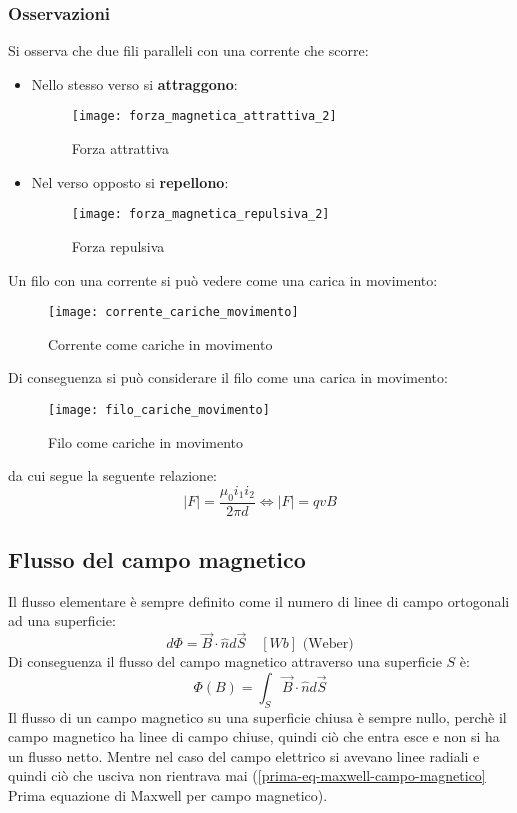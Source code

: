 \documentclass[a4paper]{article}
\begin{document}
\subsubsection{Osservazioni}
Si osserva che due fili paralleli con una corrente che scorre:
\begin{itemize}
  \item Nello stesso verso si \textbf{attraggono}:
    \begin{figure}[H]
      \centering
      \texttt{[image: forza\_magnetica\_attrattiva\_2]}
      \caption{Forza attrattiva}
    \end{figure}

  \item Nel verso opposto si \textbf{repellono}:
    \begin{figure}[H]
      \centering
      \texttt{[image: forza\_magnetica\_repulsiva\_2]}
      \caption{Forza repulsiva}
    \end{figure}
\end{itemize}
Un filo con una corrente si può vedere come una carica in movimento:
\begin{figure}[H]
  \centering
  \texttt{[image: corrente\_cariche\_movimento]}
  \caption{Corrente come cariche in movimento}
\end{figure}
\noindent
Di conseguenza si può considerare il filo come una carica in movimento:
\begin{figure}[H]
  \centering
  \texttt{[image: filo\_cariche\_movimento]}
  \caption{Filo come cariche in movimento}
\end{figure}
\noindent
da cui segue la seguente relazione:
\[
  |F| = \frac{\mu_0 i_1 i_2}{2 \pi d} \Leftrightarrow |F| = qvB
\] 

\subsection{Flusso del campo magnetico}
Il flusso elementare è sempre definito come il numero di linee di campo ortogonali
ad una superficie:
\[
  d \Phi = \vec{B} \cdot \hat{n} d\vec{S} \quad \left[ Wb \right] \text{ (Weber)}
\] 
Di conseguenza il flusso del campo magnetico attraverso una superficie \( S \) è:
\[
  \Phi (B) = \int_S \vec{B} \cdot \hat{n} d\vec{S}
\] 
Il flusso di un campo magnetico su una superficie chiusa è sempre nullo, perchè il campo
magnetico ha linee di campo chiuse, quindi ciò che entra esce e non si ha un flusso netto.
Mentre nel caso del campo elettrico si avevano linee radiali e quindi ciò che usciva non
rientrava mai (\ref{prima-eq-maxwell-campo-magnetico} Prima equazione di Maxwell per campo magnetico).
\end{document}
